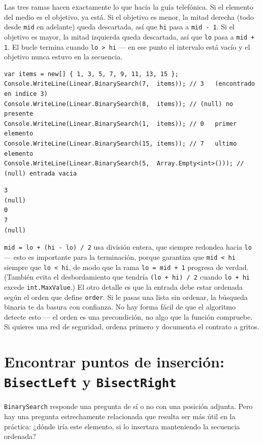 \documentclass[11pt,a4paper]{article}
\begin{document}
Las tres ramas hacen exactamente lo que hacía la guía telefónica. Si el elemento del medio es el objetivo, ya está. Si el objetivo es menor, la mitad derecha (todo desde \texttt{mid} en adelante) queda descartada, así que \texttt{hi} pasa a \texttt{mid - 1}. Si el objetivo es mayor, la mitad izquierda queda descartada, así que \texttt{lo} pasa a \texttt{mid + 1}. El bucle termina cuando \texttt{lo > hi} --- en ese punto el intervalo está vacío y el objetivo nunca estuvo en la secuencia.

\begin{lstlisting}
var items = new[] { 1, 3, 5, 7, 9, 11, 13, 15 };
Console.WriteLine(Linear.BinarySearch(7,  items)); // 3   (encontrado en indice 3)
Console.WriteLine(Linear.BinarySearch(8,  items)); // (null) no presente
Console.WriteLine(Linear.BinarySearch(1,  items)); // 0   primer elemento
Console.WriteLine(Linear.BinarySearch(15, items)); // 7   ultimo elemento
Console.WriteLine(Linear.BinarySearch(5,  Array.Empty<int>())); // (null) entrada vacia
\end{lstlisting}

\begin{verbatim}
3
(null)
0
7
(null)
\end{verbatim}

\texttt{mid = lo + (hi - lo) / 2} usa división entera, que siempre redondea hacia \texttt{lo} --- esto es importante para la terminación, porque garantiza que \texttt{mid < hi} siempre que \texttt{lo < hi}, de modo que la rama \texttt{lo = mid + 1} progresa de verdad. (También evita el desbordamiento que tendría \texttt{(lo + hi) / 2} cuando \texttt{lo + hi} excede \texttt{int.MaxValue}.) El otro detalle es que la entrada debe estar ordenada según el orden que define \texttt{order}. Si le pasas una lista sin ordenar, la búsqueda binaria te da basura con confianza. No hay forma fácil de que el algoritmo detecte esto --- el orden es una precondición, no algo que la función compruebe. Si quieres una red de seguridad, ordena primero y documenta el contrato a gritos.

\section{Encontrar puntos de inserción: \texttt{BisectLeft} y \texttt{BisectRight}}

\texttt{BinarySearch} responde una pregunta de sí o no con una posición adjunta. Pero hay una pregunta estrechamente relacionada que resulta ser más útil en la práctica: ¿dónde iría este elemento, si lo insertara manteniendo la secuencia ordenada?
\end{document}
